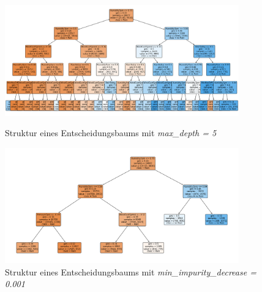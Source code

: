 \begin{figure}[H]
    \centering
     \begin{minipage}{0.45\textwidth}
        \centering
        \includegraphics[width=0.9\textwidth]{Bilder/treeMaxDepth} %
        \caption{Struktur eines Entscheidungsbaums mit \emph{max\_depth = 5}}
        \label{fig:treeMaxDepth}
    \end{minipage}\hfill
    \begin{minipage}{0.45\textwidth}
        \centering
        \includegraphics[width=0.9\textwidth]{Bilder/treeMinImpurityDecrease} %
        \caption{Struktur eines Entscheidungsbaums mit \emph{min\_impurity\_decrease = 0.001}}
        \label{fig:treeMinImpurityDecrease}
    \end{minipage}\hfill
\end{figure}

